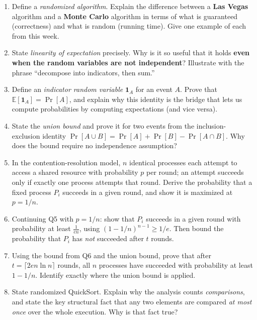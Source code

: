\documentclass[11pt]{article}
\begin{document}
\begin{enumerate}[label=\textbf{A\arabic*.}, leftmargin=2.2em]

\item Define a \emph{randomized algorithm}. Explain the difference between a
\textbf{Las Vegas} algorithm and a \textbf{Monte Carlo} algorithm in terms of what is
guaranteed (correctness) and what is random (running time). Give one example of each from
this week.

\item State \emph{linearity of expectation} precisely. Why is it so useful that it holds
\textbf{even when the random variables are not independent}? Illustrate with the phrase
``decompose into indicators, then sum.''

\item Define an \emph{indicator random variable} $\mathbf{1}_A$ for an event $A$. Prove
that $\mathbb{E}[\mathbf{1}_A] = \Pr[A]$, and explain why this identity is the bridge that
lets us compute probabilities by computing expectations (and vice versa).

\item State the \emph{union bound} and prove it for two events from the inclusion-exclusion
identity $\Pr[A\cup B] = \Pr[A] + \Pr[B] - \Pr[A\cap B]$. Why does the bound require no
independence assumption?

\item In the contention-resolution model, $n$ identical processes each attempt to access a
shared resource with probability $p$ per round; an attempt succeeds only if exactly one
process attempts that round. Derive the probability that a fixed process $P_i$ succeeds in
a given round, and show it is maximized at $p = 1/n$.

\item Continuing Q5 with $p = 1/n$: show that $P_i$ succeeds in a given round with
probability at least $\frac{1}{en}$, using $(1 - 1/n)^{n-1} \ge 1/e$. Then bound the
probability that $P_i$ has \emph{not} succeeded after $t$ rounds.

\item Using the bound from Q6 and the union bound, prove that after $t = \lceil 2en\ln
n\rceil$ rounds, all $n$ processes have succeeded with probability at least $1 - 1/n$.
Identify exactly where the union bound is applied.

\item State randomized QuickSort. Explain why the analysis counts \emph{comparisons}, and
state the key structural fact that any two elements are compared \emph{at most once} over
the whole execution. Why is that fact true?


\end{enumerate}
\end{document}
